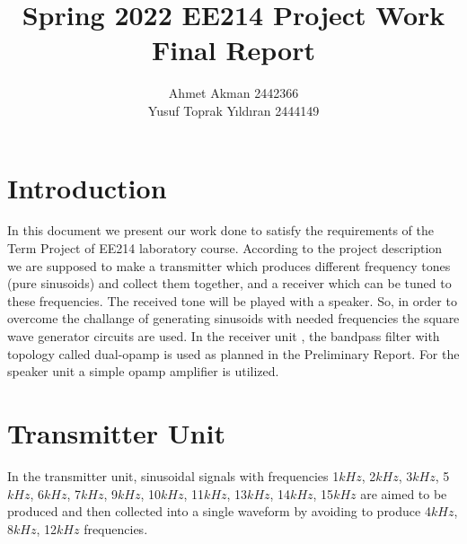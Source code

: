 \documentclass[letterpaper,12pt]{article}
\begin{document}
\thispagestyle{empty}

\title{ \vspace{-2cm} Spring 2022 EE214 Project Work  \protect\\ Final Report\vspace{-4mm}}
\author{ Ahmet Akman 2442366 \protect\\ Yusuf Toprak Yıldıran 2444149 }
\date{}
\maketitle
\section{Introduction}

In this document we present our work done to satisfy the requirements of the Term Project of EE214 laboratory course. According to the project description we are supposed to make a transmitter which produces different frequency tones (pure sinusoids) and collect them together, and a receiver which can be tuned to these frequencies. The received tone will be played with a speaker.
So, in order to overcome the challange of generating sinusoids with needed frequencies the square wave generator circuits are used. In the receiver unit , the bandpass filter with topology called dual-opamp is used as planned in the Preliminary Report. For the speaker unit a simple opamp amplifier is utilized. 


\section{Transmitter Unit}
In the transmitter unit, sinusoidal signals with frequencies 1\(kHz\), 2\(kHz\), 3\(kHz\), 5\(kHz\), 6\(kHz\), 7\(kHz\), 9\(kHz\), 10\(kHz\), 11\(kHz\), 13\(kHz\), 14\(kHz\), 15\(kHz\) are aimed to be produced and then collected into a single waveform by avoiding to produce 4\(kHz\), 8\(kHz\), 12\(kHz\) frequencies. 
\end{document}
